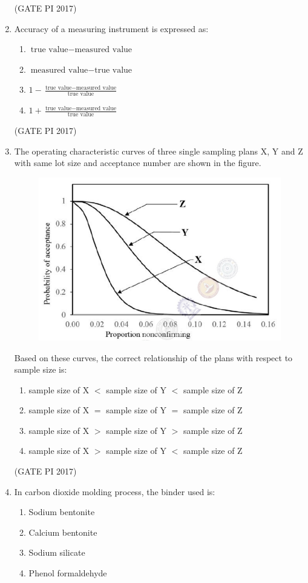 \documentclass[journal,12pt,onecolumn]{IEEEtran}
\theoremstyle{remark}
\begin{document}
\begin{enumerate}
\hfill (GATE PI 2017)

\item Accuracy of a measuring instrument is expressed as:
\begin{enumerate}
\item $\text{true value} - \text{measured value}$
\item $\text{measured value} - \text{true value}$
\item $1 - \frac{\text{true value} - \text{measured value}}{\text{true value}}$
\item $1 + \frac{\text{true value} - \text{measured value}}{\text{true value}}$
\end{enumerate}
\hfill (GATE PI 2017)

\item The operating characteristic curves of three single sampling plans X, Y and Z with same lot size and acceptance number are shown in the figure.

\begin{figure}[H]
    \centering
    \includegraphics[width=0.5\columnwidth]{figs/fig1.png}
    \caption{}
    \label{fig:placeholder}
\end{figure} 


Based on these curves, the correct relationship of the plans with respect to sample size is:
\begin{enumerate}
\item sample size of X $<$ sample size of Y $<$ sample size of Z
\item sample size of X $=$ sample size of Y $=$ sample size of Z
\item sample size of X $>$ sample size of Y $>$ sample size of Z
\item sample size of X $>$ sample size of Y $<$ sample size of Z
\end{enumerate}
\hfill (GATE PI 2017)

\item In carbon dioxide molding process, the binder used is:
\begin{enumerate}
\item Sodium bentonite
\item Calcium bentonite
\item Sodium silicate
\item Phenol formaldehyde
\end{enumerate}


\end{enumerate}
\end{document}
